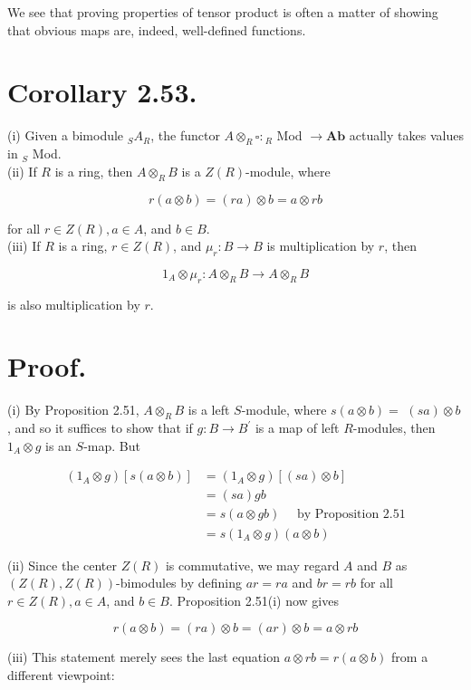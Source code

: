 \documentclass[10pt]{article}
\begin{document}
We see that proving properties of tensor product is often a matter of showing that obvious maps are, indeed, well-defined functions.

\section*{Corollary 2.53.}
(i) Given a bimodule ${ }_{S} A_{R}$, the functor $A \otimes_{R} \square:{ }_{R}$ Mod $\rightarrow \mathbf{A b}$ actually takes values in ${ }_{S}$ Mod.\\
(ii) If $R$ is a ring, then $A \otimes_{R} B$ is a $Z(R)$-module, where

$$
r(a \otimes b)=(r a) \otimes b=a \otimes r b
$$

for all $r \in Z(R), a \in A$, and $b \in B$.\\
(iii) If $R$ is a ring, $r \in Z(R)$, and $\mu_{r}: B \rightarrow B$ is multiplication by $r$, then

$$
1_{A} \otimes \mu_{r}: A \otimes_{R} B \rightarrow A \otimes_{R} B
$$

is also multiplication by $r$.

\section*{Proof.}
(i) By Proposition 2.51, $A \otimes_{R} B$ is a left $S$-module, where $s(a \otimes b)=$ $(s a) \otimes b$, and so it suffices to show that if $g: B \rightarrow B^{\prime}$ is a map of left $R$-modules, then $1_{A} \otimes g$ is an $S$-map. But

$$
\begin{aligned}
\left(1_{A} \otimes g\right)[s(a \otimes b)] & =\left(1_{A} \otimes g\right)[(s a) \otimes b] \\
& =(s a) g b \\
& =s(a \otimes g b) \quad \text { by Proposition } 2.51 \\
& =s\left(1_{A} \otimes g\right)(a \otimes b)
\end{aligned}
$$

(ii) Since the center $Z(R)$ is commutative, we may regard $A$ and $B$ as $(Z(R), Z(R))$-bimodules by defining $a r=r a$ and $b r=r b$ for all $r \in Z(R), a \in A$, and $b \in B$. Proposition 2.51(i) now gives

$$
r(a \otimes b)=(r a) \otimes b=(a r) \otimes b=a \otimes r b
$$

(iii) This statement merely sees the last equation $a \otimes r b=r(a \otimes b)$ from a different viewpoint:
\end{document}
